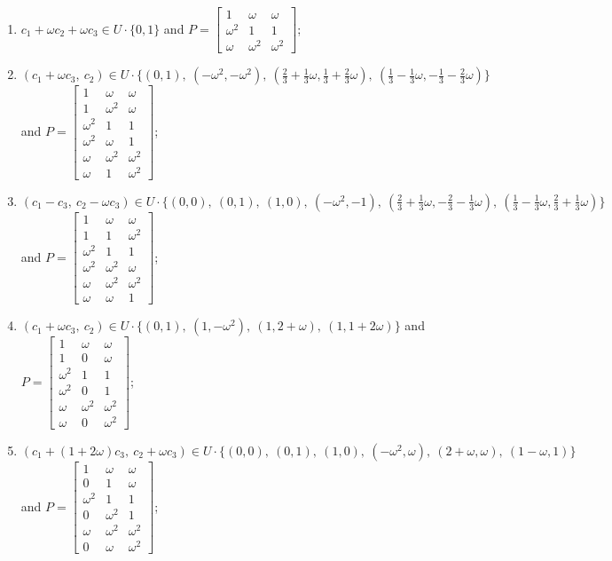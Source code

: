 
\begin{enumerate}
\item[(f1)] $c_1+\omega c_2+\omega c_3\in U\cdot\{0,1\}$ and $P=\begin{bmatrix}1&\omega&\omega\\\omega^2&1&1\\\omega&\omega^2&\omega^2\end{bmatrix}$;
\item[(f2)] $(c_1+\omega c_3,\ c_2)\in U\cdot\{(0,1),\allowbreak\ (-\omega^2,-\omega^2),\allowbreak\ (\tfrac{2}{3}+\tfrac{1}{3}\omega,\tfrac{1}{3}+\tfrac{2}{3}\omega),\allowbreak\ (\tfrac{1}{3}-\tfrac{1}{3}\omega,-\tfrac{1}{3}-\tfrac{2}{3}\omega)\}$ and $P=\begin{bmatrix}1&\omega&\omega\\1&\omega^2&\omega\\\omega^2&1&1\\\omega^2&\omega&1\\\omega&\omega^2&\omega^2\\\omega&1&\omega^2\end{bmatrix}$;
\item[(f3)] $(c_1- c_3,\ c_2-\omega c_3)\in U\cdot\{(0,0),\allowbreak\ (0,1),\allowbreak\ (1,0),\allowbreak\ (-\omega^2,-1),\allowbreak\ (\tfrac{2}{3}+\tfrac{1}{3}\omega,-\tfrac{2}{3}-\tfrac{1}{3}\omega),\allowbreak\ (\tfrac{1}{3}-\tfrac{1}{3}\omega,\tfrac{2}{3}+\tfrac{1}{3}\omega)\}$ and $P=\begin{bmatrix}1&\omega&\omega\\1&1&\omega^2\\\omega^2&1&1\\\omega^2&\omega^2&\omega\\\omega&\omega^2&\omega^2\\\omega&\omega&1\end{bmatrix}$;
\item[(f4)] $(c_1+\omega c_3,\ c_2)\in U\cdot\{(0,1),\allowbreak\ (1,-\omega^2),\allowbreak\ (1,2+\omega),\allowbreak\ (1,1+2\omega)\}$ and $P=\begin{bmatrix}1&\omega&\omega\\1&0&\omega\\\omega^2&1&1\\\omega^2&0&1\\\omega&\omega^2&\omega^2\\\omega&0&\omega^2\end{bmatrix}$;
\item[(f5)] $(c_1+(1+2\omega) c_3,\ c_2+\omega c_3)\in U\cdot\{(0,0),\allowbreak\ (0,1),\allowbreak\ (1,0),\allowbreak\ (-\omega^2,\omega),\allowbreak\ (2+\omega,\omega),\allowbreak\ (1-\omega,1)\}$ and $P=\begin{bmatrix}1&\omega&\omega\\0&1&\omega\\\omega^2&1&1\\0&\omega^2&1\\\omega&\omega^2&\omega^2\\0&\omega&\omega^2\end{bmatrix}$;

\end{enumerate}
